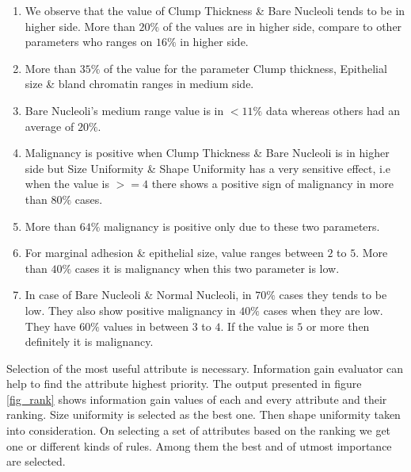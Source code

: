 \documentclass[conference]{IEEEtran}
\begin{document}
\begin{enumerate}
  \item We observe that the value of Clump Thickness \& Bare Nucleoli tends to be in higher side. More than $20\%$ of the values are in higher side, compare to other parameters who ranges on $16\%$ in higher side.

  \item More than $35\%$ of the value for the parameter Clump thickness, Epithelial size \& bland chromatin ranges in medium side.

  \item Bare Nucleoli's medium range value is in $< 11\%$ data whereas others had an average of $20\%$.

  \item Malignancy is positive when Clump Thickness \& Bare Nucleoli is in higher side but Size Uniformity \& Shape Uniformity has a very sensitive effect, i.e when the value is $>=4$ there shows a positive sign of malignancy in more than $80\%$ cases.

  \item More than $64\%$ malignancy is positive only due to these two parameters.

  \item For marginal adhesion \& epithelial size, value ranges between $2$ to $5$. More than $40\%$ cases it is malignancy when this two parameter is low.

  \item In case of Bare Nucleoli \& Normal Nucleoli, in $70\%$ cases they tends to be low. They also show positive malignancy in $40\%$ cases when they are low. They have $60\%$ values in between $3$ to $4$. If the value is $5$ or more then definitely it is malignancy.
\end{enumerate}

Selection of the most useful attribute is necessary. Information gain evaluator can help to find the attribute highest priority. The output presented  in figure \ref{fig_rank} shows information gain values of each and every attribute and their ranking. Size uniformity is selected as the best one. Then shape uniformity taken into consideration. On selecting a set of attributes based on the ranking we get one or different kinds of rules. Among them the best and of utmost importance are selected.
\end{document}
